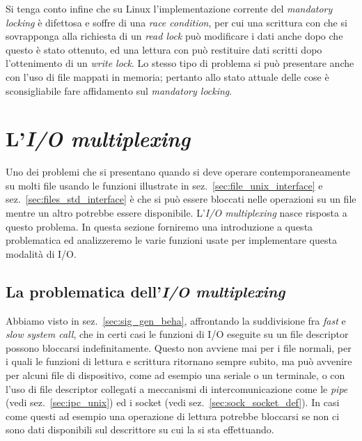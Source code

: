 Si tenga conto infine che su Linux l'implementazione corrente del
\textit{mandatory locking} è difettosa e soffre di una \textit{race
  condition}, per cui una scrittura con  che si sovrapponga alla
richiesta di un \textit{read lock} può modificare i dati anche dopo che questo
è stato ottenuto, ed una lettura con  può restituire dati scritti
dopo l'ottenimento di un \textit{write lock}. Lo stesso tipo di problema si
può presentare anche con l'uso di file mappati in memoria; pertanto allo stato
attuale delle cose è sconsigliabile fare affidamento sul \textit{mandatory
  locking}.





\section{L'\textit{I/O multiplexing}}
\label{sec:file_multiplexing}


Uno dei problemi che si presentano quando si deve operare contemporaneamente
su molti file usando le funzioni illustrate in
sez.~\ref{sec:file_unix_interface} e sez.~\ref{sec:files_std_interface} è che
si può essere bloccati nelle operazioni su un file mentre un altro potrebbe
essere disponibile. L'\textit{I/O multiplexing} nasce risposta a questo
problema. In questa sezione forniremo una introduzione a questa problematica
ed analizzeremo le varie funzioni usate per implementare questa modalità di
I/O.


\subsection{La problematica dell'\textit{I/O multiplexing}}
\label{sec:file_noblocking}

Abbiamo visto in sez.~\ref{sec:sig_gen_beha}, affrontando la suddivisione fra
\textit{fast} e \textit{slow} \textit{system call}, che in certi casi le
funzioni di I/O eseguite su un file descriptor possono bloccarsi
indefinitamente. Questo non avviene mai per i file normali, per i quali le
funzioni di lettura e scrittura ritornano sempre subito, ma può avvenire per
alcuni file di dispositivo, come ad esempio una seriale o un terminale, o con
l'uso di file descriptor collegati a meccanismi di intercomunicazione come le
\textit{pipe} (vedi sez.~\ref{sec:ipc_unix}) ed i socket (vedi
sez.~\ref{sec:sock_socket_def}). In casi come questi ad esempio una operazione
di lettura potrebbe bloccarsi se non ci sono dati disponibili sul descrittore
su cui la si sta effettuando.

